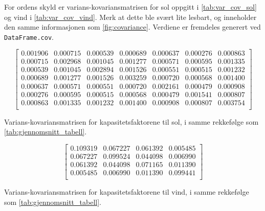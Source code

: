 \documentclass{article}
\begin{document}
\subsubsection{}
For ordens skyld er varians-kovariansmatrisen for sol oppgitt i \autoref{tab:var_cov_sol} og vind i \autoref{tab:var_cov_vind}. Merk at dette ble svært lite lesbart, og inneholder den samme informasjonen som \autoref{fig:covariance}. Verdiene er fremdeles generert ved \verb|DataFrame.cov|.

\begin{table}[h]
\centering
$$
\begin{bmatrix}
0.001906 & 0.000715 & 0.000539 & 0.000689 & 0.000637 & 0.000276 & 0.000863 \\
0.000715 & 0.002968 & 0.001045 & 0.001277 & 0.000571 & 0.000595 & 0.001335 \\
0.000539 & 0.001045 & 0.002894 & 0.001526 & 0.000551 & 0.000515 & 0.001232 \\
0.000689 & 0.001277 & 0.001526 & 0.003259 & 0.000720 & 0.000568 & 0.001400 \\
0.000637 & 0.000571 & 0.000551 & 0.000720 & 0.002161 & 0.000479 & 0.000908 \\
0.000276 & 0.000595 & 0.000515 & 0.000568 & 0.000479 & 0.001541 & 0.000807 \\
0.000863 & 0.001335 & 0.001232 & 0.001400 & 0.000908 & 0.000807 & 0.003754 \\
\end{bmatrix}
$$
\caption{Varians-kovariansmatrisen for kapasitetsfaktorene til sol, i samme rekkefølge som \autoref{tab:gjennomsnitt_tabell}.}
\label{tab:var_cov_sol}
\end{table}

\begin{table}[h]
\centering
$$
\begin{bmatrix}
0.109319 & 0.067227 & 0.061392 & 0.005485 \\
0.067227 & 0.099524 & 0.044098 & 0.006990 \\
0.061392 & 0.044098 & 0.071165 & 0.011390 \\
0.005485 & 0.006990 & 0.011390 & 0.099441 \\
\end{bmatrix}
$$
\caption{Varians-kovariansmatrisen for kapasitetsfaktorene til vind, i samme rekkefølge som \autoref{tab:gjennomsnitt_tabell}.}
\label{tab:var_cov_vind}
\end{table}






\end{document}
